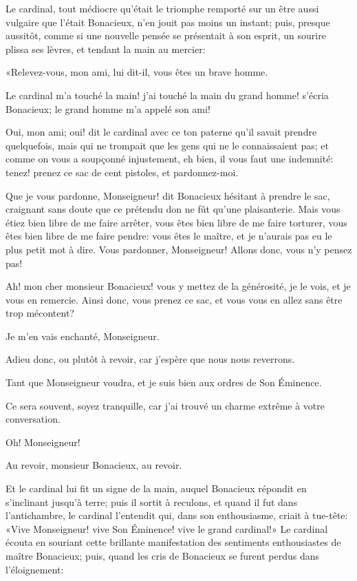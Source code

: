 Le cardinal, tout médiocre qu'était le triomphe remporté sur un être aussi vulgaire que l'était Bonacieux, n'en jouit pas moins un instant; puis, presque aussitôt, comme si une nouvelle pensée se présentait à son esprit, un sourire plissa ses lèvres, et tendant la main au mercier: 

«Relevez-vous, mon ami, lui dit-il, vous êtes un brave homme. 

\speak  Le cardinal m'a touché la main! j'ai touché la main du grand homme! s'écria Bonacieux; le grand homme m'a appelé son ami! 

\speak  Oui, mon ami; oui! dit le cardinal avec ce ton paterne qu'il savait prendre quelquefois, mais qui ne trompait que les gens qui ne le connaissaient pas; et comme on vous a soupçonné injustement, eh bien, il vous faut une indemnité: tenez! prenez ce sac de cent pistoles, et pardonnez-moi. 

\speak  Que je vous pardonne, Monseigneur! dit Bonacieux hésitant à prendre le sac, craignant sans doute que ce prétendu don ne fût qu'une plaisanterie. Mais vous étiez bien libre de me faire arrêter, vous êtes bien libre de me faire torturer, vous êtes bien libre de me faire pendre: vous êtes le maître, et je n'aurais pas eu le plus petit mot à dire. Vous pardonner, Monseigneur! Allons donc, vous n'y pensez pas! 

\speak  Ah! mon cher monsieur Bonacieux! vous y mettez de la générosité, je le vois, et je vous en remercie. Ainsi donc, vous prenez ce sac, et vous vous en allez sans être trop mécontent? 

\speak  Je m'en vais enchanté, Monseigneur. 

\speak  Adieu donc, ou plutôt à revoir, car j'espère que nous nous reverrons. 

\speak  Tant que Monseigneur voudra, et je suis bien aux ordres de Son Éminence. 

\speak  Ce sera souvent, soyez tranquille, car j'ai trouvé un charme extrême à votre conversation. 

\speak  Oh! Monseigneur! 

\speak  Au revoir, monsieur Bonacieux, au revoir. 

Et le cardinal lui fit un signe de la main, auquel Bonacieux répondit en s'inclinant jusqu'à terre; puis il sortit à reculons, et quand il fut dans l'antichambre, le cardinal l'entendit qui, dans son enthousiasme, criait à tue-tête: «Vive Monseigneur! vive Son Éminence! vive le grand cardinal!» Le cardinal écouta en souriant cette brillante manifestation des sentiments enthousiastes de maître Bonacieux; puis, quand les cris de Bonacieux se furent perdus dans l'éloignement: 

